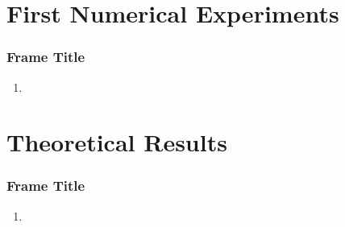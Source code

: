 \documentclass[aspectratio=169,xcolor=dvipsnames,11pt]{beamer}
\begin{document}
 \section{First Numerical Experiments}
 \begin{frame}\frametitle{Frame Title}
        \begin{enumerate}
    	\item
    \end{enumerate}
 \end{frame}
 
  \section{Theoretical Results}
 \begin{frame}\frametitle{Frame Title}
        \begin{enumerate}
    	\item
    \end{enumerate}
 \end{frame}
\end{document}
